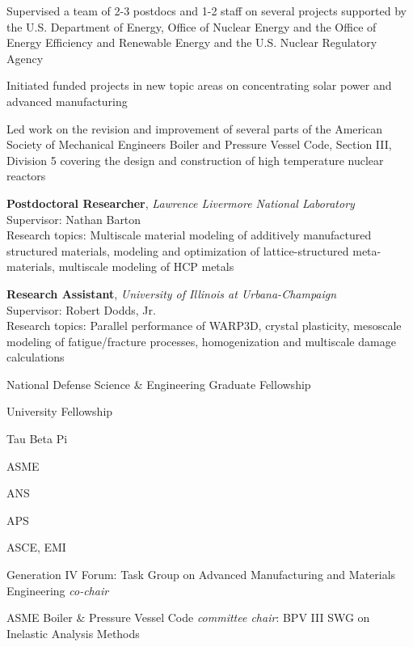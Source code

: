 Supervised a team of 2-3 postdocs and 1-2 staff on several projects
supported by the U.S. Department of Energy, Office of Nuclear Energy and 
the Office of Energy Efficiency and Renewable Energy
and the U.S. Nuclear Regulatory Agency

Initiated funded projects in new topic areas on concentrating solar power and advanced manufacturing

Led work on the revision and improvement of several parts of the American Society of 
Mechanical Engineers Boiler and Pressure Vessel Code, Section III, Division 5 covering the
design and construction of high temperature nuclear reactors

\textbf{Postdoctoral Researcher}, \emph{Lawrence Livermore National
Laboratory} \\
Supervisor: Nathan Barton \\
Research topics: Multiscale material modeling of additively manufactured
structured materials, modeling and optimization of lattice-structured
meta-materials, multiscale modeling of HCP metals

\textbf{Research Assistant}, \emph{University of Illinois at Urbana-Champaign}
\\
Supervisor: Robert Dodds, Jr. \\
Research topics: Parallel performance of WARP3D, crystal plasticity,
mesoscale modeling of fatigue/fracture processes, homogenization and
multiscale damage calculations


National Defense Science \& Engineering Graduate Fellowship 

University Fellowship 

Tau Beta Pi 


ASME 

ANS 

APS 

ASCE, EMI 


Generation IV Forum:  Task Group on Advanced Manufacturing and Materials Engineering \emph{co-chair} 

ASME Boiler \& Pressure Vessel Code \emph{committee chair}:  BPV III SWG on Inelastic Analysis Methods 

